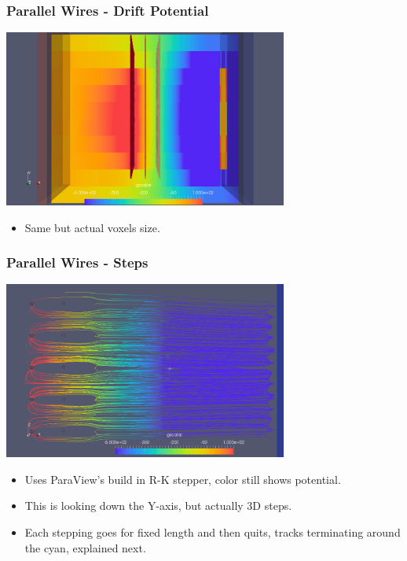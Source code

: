 \documentclass[xcolor=dvipsnames]{beamer}
\begin{document}
\begin{frame}
  \frametitle{Parallel Wires - Drift Potential}
  \begin{center}
    \includegraphics[width=0.7\textwidth]{twodee-fine-drift-field-side.png}
  \end{center}
  \begin{itemize}\footnotesize
  \item Same but actual voxels size.
  \end{itemize}
\end{frame}

\begin{frame}
  \frametitle{Parallel Wires - Steps}
  \begin{center}
    \includegraphics[width=0.7\textwidth]{twodee-fine-drift-steps-plan.png}    
  \end{center}
  \begin{itemize}\footnotesize
  \item Uses ParaView's build in R-K stepper, color still shows potential.
  \item This is looking down the Y-axis, but actually 3D steps.
  \item Each stepping goes for fixed length and then quits, tracks
    terminating around the cyan, explained next.
  \end{itemize}
\end{frame}
\end{document}
